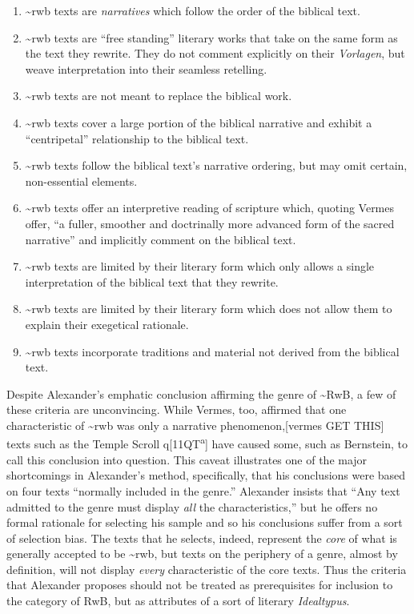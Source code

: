 \begin{enumerate}
\def\labelenumi{\arabic{enumi}.}
\tightlist
\item
  \textasciitilde{}rwb texts are \emph{narratives} which follow the
  order of the biblical text.
\item
  \textasciitilde{}rwb texts are ``free standing'' literary works that
  take on the same form as the text they rewrite. They do not comment
  explicitly on their \emph{Vorlagen}, but weave interpretation into
  their seamless retelling.
\item
  \textasciitilde{}rwb texts are not meant to replace the biblical work.
\item
  \textasciitilde{}rwb texts cover a large portion of the biblical
  narrative and exhibit a ``centripetal'' relationship to the biblical
  text.
\item
  \textasciitilde{}rwb texts follow the biblical text's narrative
  ordering, but may omit certain, non-essential elements.
\item
  \textasciitilde{}rwb texts offer an interpretive reading of scripture
  which, quoting Vermes offer, ``a fuller, smoother and doctrinally more
  advanced form of the sacred narrative''\autocite[Citing Vermes
  in][305]{schurer1986} and implicitly comment on the biblical text.
\item
  \textasciitilde{}rwb texts are limited by their literary form which
  only allows a single interpretation of the biblical text that they
  rewrite.
\item
  \textasciitilde{}rwb texts are limited by their literary form which
  does not allow them to explain their exegetical rationale.
\item
  \textasciitilde{}rwb texts incorporate traditions and material not
  derived from the biblical text.
\end{enumerate}

Despite Alexander's emphatic conclusion affirming the genre of
\textasciitilde{}RwB, a few of these criteria are unconvincing. While
Vermes, too, affirmed that one characteristic of \textasciitilde{}rwb
was only a narrative phenomenon,{[}vermes GET THIS{]} texts such as the
Temple Scroll q{[}11QT\textsuperscript{a}{]} have caused some, such as
Bernstein, to call this conclusion into
question.\autocite{bernstein_textus2005} This caveat illustrates one of
the major shortcomings in Alexander's method, specifically, that his
conclusions were based on four texts ``normally included in the
genre.''\autocite[99]{alexander_carson-williamson1988} Alexander insists
that ``Any text admitted to the genre must display \emph{all} the
characteristics,''\autocite[119 n. 11]{alexander_carson-williamson1988}
but he offers no formal rationale for selecting his sample and so his
conclusions suffer from a sort of selection bias. The texts that he
selects, indeed, represent the \emph{core} of what is generally accepted
to be \textasciitilde{}rwb, but texts on the periphery of a genre,
almost by definition, will not display \emph{every} characteristic of
the core texts. Thus the criteria that Alexander proposes should not be
treated as prerequisites for inclusion to the category of RwB, but as
attributes of a sort of literary \emph{Idealtypus}.

